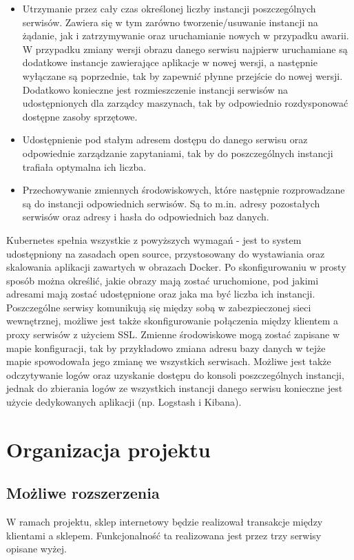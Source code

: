 \documentclass[11pt,a4paper,twoside]{article}
\begin{document}
\begin{itemize}
\item Utrzymanie przez cały czas określonej liczby instancji poszczególnych serwisów. Zawiera się w tym zarówno tworzenie/usuwanie instancji na żądanie, jak i zatrzymywanie oraz uruchamianie nowych w przypadku awarii. W przypadku zmiany wersji obrazu danego serwisu najpierw uruchamiane są dodatkowe instancje zawierające aplikacje w nowej wersji, a następnie wyłączane są poprzednie, tak by zapewnić płynne przejście do nowej wersji. Dodatkowo konieczne jest rozmieszczenie instancji serwisów na udostępnionych dla zarządcy maszynach, tak by odpowiednio rozdysponować dostępne zasoby sprzętowe.
\item Udostępnienie pod stałym adresem dostępu do danego serwisu oraz odpowiednie zarządzanie zapytaniami, tak by do poszczególnych instancji trafiała optymalna ich liczba.
\item Przechowywanie zmiennych środowiskowych, które następnie rozprowadzane są do instancji odpowiednich serwisów. Są to m.in. adresy pozostałych serwisów oraz adresy i hasła do odpowiednich baz danych.
\end{itemize}

Kubernetes spełnia wszystkie z powyższych wymagań - jest to system udostępniony na zasadach open source, przystosowany do wystawiania oraz skalowania aplikacji zawartych w obrazach Docker. Po skonfigurowaniu w prosty sposób można określić, jakie obrazy mają zostać uruchomione, pod jakimi adresami mają zostać udostępnione oraz jaka ma być liczba ich instancji. Poszczególne serwisy komunikują się między sobą w zabezpieczonej sieci wewnętrznej, możliwe jest także skonfigurowanie połączenia między klientem a proxy serwisów z użyciem SSL. Zmienne środowiskowe mogą zostać zapisane w mapie konfiguracji, tak by przykładowo zmiana adresu bazy danych w tejże mapie spowodowała jego zmianę we wszystkich serwisach. Możliwe jest także odczytywanie logów oraz uzyskanie dostępu do konsoli poszczególnych instancji, jednak do zbierania logów ze wszystkich instancji danego serwisu konieczne jest użycie dedykowanych aplikacji (np. Logstash i Kibana).

\section{Organizacja projektu}
\subsection{Możliwe rozszerzenia}
W ramach projektu, sklep internetowy będzie realizował transakcje między klientami a sklepem. Funkcjonalność ta realizowana jest przez trzy serwisy opisane wyżej.
\end{document}
